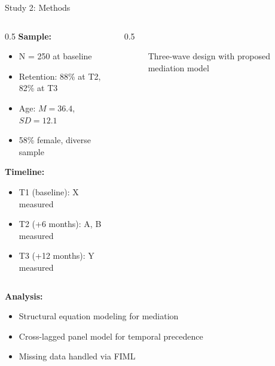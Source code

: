\documentclass[aspectratio=169,12pt]{beamer}
\begin{document}
\begin{frame}{Study 2: Methods}
  \begin{columns}[T]

    \begin{column}{0.5\textwidth}
      \textbf{Sample:}
      \begin{itemize}
        \item N = 250 at baseline
        \item Retention: 88\% at T2, 82\% at T3
        \item Age: $M = 36.4$, $SD = 12.1$
        \item 58\% female, diverse sample
      \end{itemize}

      \vspace{0.5cm}

      \textbf{Timeline:}
      \begin{itemize}
        \item T1 (baseline): X measured
        \item T2 (+6 months): A, B measured
        \item T3 (+12 months): Y measured
      \end{itemize}
    \end{column}

    \begin{column}{0.5\textwidth}
      \begin{figure}
        \centering
        \caption{Three-wave design with proposed mediation model}
      \end{figure}
    \end{column}

  \end{columns}

  \vspace{0.5cm}

  \textbf{Analysis:}
  \begin{itemize}
    \item Structural equation modeling for mediation
    \item Cross-lagged panel model for temporal precedence
    \item Missing data handled via FIML
  \end{itemize}
\end{frame}
\end{document}
